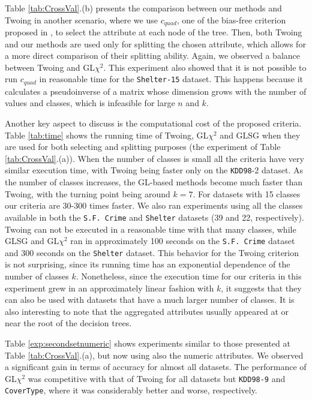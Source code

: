 Table \ref{tab:CrossVal}.(b) presents the 
comparison between  our  methods and Twoing in another scenario,
where we use $c_{quad}$, one of the bias-free   criterion proposed in \cite{Hothorn:2006:URP}, to select the attribute at each node of the tree. 
Then, both Twoing and our methods
are  used only for splitting the chosen attribute,
 which allows for a 
  more direct comparison of their splitting ability. Again, we observed a balance between Twoing and GL$\chi^2$. This experiment also showed that it is not possible to run $c_{quad}$ in reasonable time for the {\tt Shelter-15} dataset. This happens because it calculates a pseudoinverse of a matrix whose dimension grows with the number of values and classes, which is infeasible for large $n$ and $k$.

Another key aspect to discuss is the computational cost
of the proposed criteria.
Table \ref{tab:time}
shows the running time of Twoing, GL$\chi^2$ and GLSG  when
they are used for both selecting and splitting purposes (the experiment of Table \ref{tab:CrossVal}.(a)).
When the number of classes is
small all the criteria have very similar execution time, with Twoing being faster only on the {\tt KDD98}-2 dataset. As the number of classes increases, the GL-based methods become much faster than Twoing, with the turning point being around $k=7$. For datasets with 15 classes our criteria are 30-300 times faster. We also ran experiments using all the classes available in both the {\tt S.F. Crime} and {\tt Shelter} datasets (39 and 22, respectively). Twoing can not be executed in a reasonable time with that many classes, while GLSG and GL$\chi^2$ ran in approximately 100 seconds on the {\tt S.F. Crime} dataset and  300 seconds on the {\tt Shelter} dataset.  This behavior for the Twoing criterion is not surprising, since its running time has an exponential dependence of the number of classes $k$. Nonetheless, since the execution time for our criteria in this experiment grew in an approximately linear fashion with $k$, it suggests that they can also be used with datasets that have a much larger number of classes. It is also interesting to note that the aggregated attributes usually appeared at or near the root of the decision trees.

Table \ref{exp:secondsetnumeric}
shows experiments  similar to those presented at 
Table \ref{tab:CrossVal}.(a), but now
using also the numeric attributes.
We observed a significant gain in terms of accuracy 
 for almost all datasets. 
The performance of GL$\chi^2$ was competitive with that of
Twoing for all datasets but {\tt KDD98-9} and {\tt CoverType}, where it was
considerably  better and worse, respectively.


